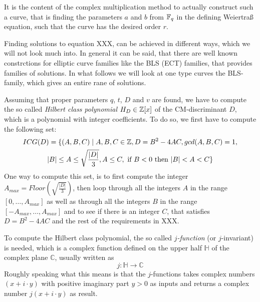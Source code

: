 It is the content of the complex multiplication method to actually construct such a curve, that is finding the parameters $a$ and $b$ from $\mathbb{F}_q$ in the defining Weiertraß equation, such that the curve has the desired order $r$. 

Finding solutions to equation XXX, can be achieved in different ways, which we will not look much into. In general it can be said, that there are well known constrctions for elliptic curve families like the BLS (ECT) families, that provides families of solutions. In what follows we will look at one type curves the BLS-family, which gives an entire rane of solutions.

Assuming that proper parameters $q$, $t$, $D$ and $v$ are found, we have to compute the so called \textit{Hilbert class polynomial} $H_D\in \mathbb{Z}[x]$ of the CM-discriminant $D$, which is a polynomial with integer coefficients. To do so, we first have to compute the following set:
\begin{multline*}
ICG(D)=\{(A,B,C)\;|\; A,B,C\in\mathbb{Z}, D = B^2-4AC, gcd(A,B,C)=1, \\
|B|\leq A \leq \sqrt{\frac{|D|}{3}}, A\leq C, 
\text{ if } B< 0 \text{ then } |B| < A < C\}
\end{multline*} 
One way to compute this set, is to first compute the integer $A_{max}= Floor(\sqrt{\frac{|D|}{3}})$, then loop through all the integers $A$ in the range $[0,\ldots,A_{max}]$ as well as through all the integers $B$ in the range $[-A_{max},\ldots,A_{max}]$ and to see if there is an integer $C$, that satisfies $D = B^2-4AC$ and the rest of the requirements in XXX.

To compute the Hilbert class polynomial, the so called \textit{$j$-function} (or $j$-invariant) is needed, which is a complex function defined on the upper half $\mathbb{H}$ of the complex plane $\mathbb{C}$, usually written as
\begin{equation}
j: \mathbb{H} \to \mathbb{C}
\end{equation}
Roughly speaking what this means is that the $j$-functions takes complex numbers 
$(x +i\cdot y)$ with positive imaginary part $y>0$ as inputs and returns a complex number $j(x+i\cdot y)$ as result.

